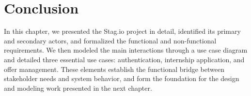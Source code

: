 \section{Conclusion}

In this chapter, we presented the Stag.io project in detail, identified its primary and secondary actors, and formalized the functional and non-functional requirements. We then modeled the main interactions through a use case diagram and detailed three essential use cases: authentication, internship application, and offer management. These elements establish the functional bridge between stakeholder needs and system behavior, and form the foundation for the design and modeling work presented in the next chapter.
